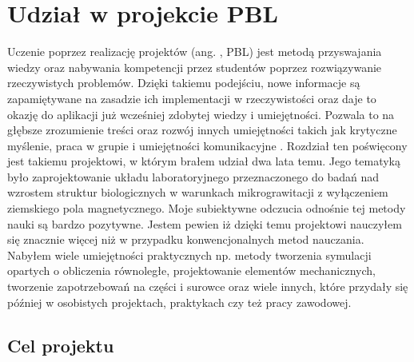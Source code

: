 \graphicspath{{./PBL/images}}

\chapter{Udział w projekcie PBL}

Uczenie poprzez realizację projektów (ang. , PBL) jest metodą przyswajania wiedzy oraz nabywania kompetencji przez studentów poprzez rozwiązywanie rzeczywistych problemów. Dzięki takiemu podejściu, nowe informacje są zapamiętywane na zasadzie ich implementacji w rzeczywistości oraz daje to okazję do aplikacji już wcześniej zdobytej wiedzy i umiejętności. Pozwala to na głębsze zrozumienie treści oraz rozwój innych umiejętności takich jak krytyczne myślenie, praca w grupie i umiejętności komunikacyjne \cite{bib:PBL}. Rozdział ten poświęcony jest takiemu projektowi, w którym brałem udział dwa lata temu. Jego tematyką było zaprojektowanie układu laboratoryjnego przeznaczonego do badań nad wzrostem struktur biologicznych w warunkach mikrograwitacji z wyłączeniem ziemskiego pola magnetycznego. Moje subiektywne odczucia odnośnie tej metody nauki są bardzo pozytywne. Jestem pewien iż dzięki temu projektowi nauczyłem się znacznie więcej niż w przypadku konwencjonalnych metod nauczania. Nabyłem wiele umiejętności praktycznych np. metody tworzenia symulacji opartych o obliczenia równoległe, projektowanie elementów mechanicznych, tworzenie zapotrzebowań na części i surowce oraz wiele innych, które przydały się później \linebreak w osobistych projektach, praktykach czy też pracy zawodowej.

\section{Cel projektu} \label{cel_projektu}

